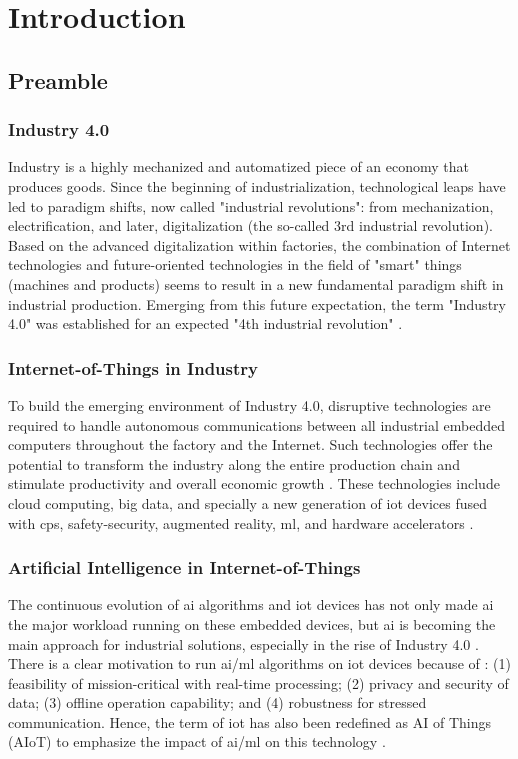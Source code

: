 \chapter{Introduction}\label{chap.intro}
\minitoc
\section{Preamble}
\subsection{Industry 4.0}
Industry is a highly mechanized and automatized piece of an economy that produces goods. Since the beginning of industrialization, technological leaps have led to paradigm shifts, now called "industrial revolutions": from mechanization, electrification, and later, digitalization (the so-called 3rd industrial revolution). Based on the advanced digitalization within factories, the combination of Internet technologies and future-oriented technologies in the field of "smart" things (machines and products) seems to result in a new fundamental paradigm shift in industrial production. Emerging from this future expectation, the term "Industry 4.0" was established for an expected "4th industrial revolution" \cite{lasi2014industry}.


\subsection{Internet-of-Things in Industry}
To build the emerging environment of Industry 4.0, disruptive technologies are required to handle autonomous communications between all industrial embedded computers throughout the factory and the Internet. Such technologies offer the potential to transform the industry along the entire production chain and stimulate productivity and overall economic growth \cite{espinoza2020estimating}. These technologies include cloud computing, big data, and specially a new generation of \gls{iot} devices fused with \gls{cps}, safety-security, augmented reality, \gls{ml}, and hardware accelerators \cite{alcacer2019scanning}.

\subsection{Artificial Intelligence in Internet-of-Things}
The continuous evolution of \gls{ai} algorithms and \gls{iot} devices has not only made \gls{ai} the major workload running on these embedded devices, but \gls{ai} is becoming the main approach for industrial solutions, especially in the rise of Industry 4.0 \cite{alcacer2019scanning}. There is a clear motivation to run \gls{ai}/\gls{ml} algorithms on \gls{iot} devices because of \cite{loh20201}: (1) feasibility of mission-critical with real-time processing; (2) privacy and security of data; (3) offline operation capability; and (4) robustness for stressed communication. Hence, the term of \gls{iot} has also been redefined as AI of Things (AIoT) to emphasize the impact of \gls{ai}/\gls{ml} on this technology \cite{zhang2020empowering}.

